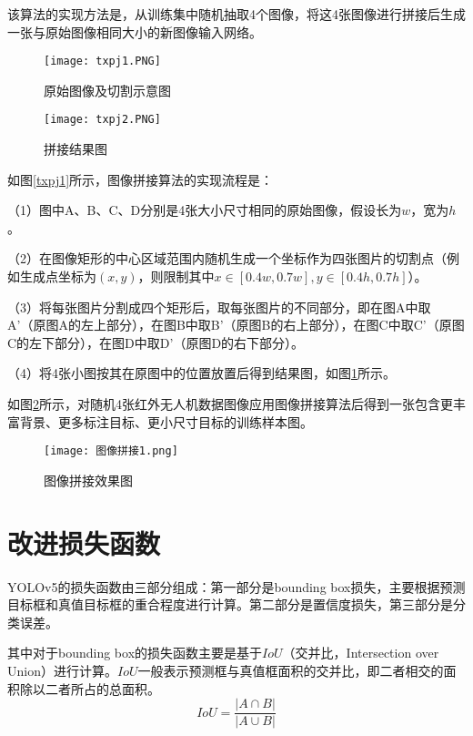 该算法的实现方法是，从训练集中随机抽取4个图像，将这4张图像进行拼接后生成一张与原始图像相同大小的新图像输入网络。

\begin{figure}[htbp]
	\centering
	\begin{minipage}{0.49\linewidth}
		\centering
		\texttt{[image: txpj1.PNG]}
		\caption{原始图像及切割示意图}
		\label{txpj1}%
	\end{minipage}
	\begin{minipage}{0.49\linewidth}
		\centering
		\texttt{[image: txpj2.PNG]}
		\caption{拼接结果图}
		\label{txpj2}%
	\end{minipage}
\end{figure}

如图\ref{txpj1}所示，图像拼接算法的实现流程是：

（1）图中A、B、C、D分别是4张大小尺寸相同的原始图像，假设长为$w$，宽为$h$。

（2）在图像矩形的中心区域范围内随机生成一个坐标作为四张图片的切割点（例如生成点坐标为$(x,y)$，则限制其中$x\in[0.4w,0.7w],y\in[0.4h,0.7h]$）。

（3）将每张图片分割成四个矩形后，取每张图片的不同部分，即在图A中取A'（原图A的左上部分），在图B中取B'（原图B的右上部分），在图C中取C'（原图C的左下部分），在图D中取D'（原图D的右下部分）。

（4）将4张小图按其在原图中的位置放置后得到结果图，如图\ref{txpj2}所示。

如图\ref{txpj}所示，对随机4张红外无人机数据图像应用图像拼接算法后得到一张包含更丰富背景、更多标注目标、更小尺寸目标的训练样本图。

\begin{figure}[htpb]
  \centering
  \texttt{[image: 图像拼接1.png]}
  \caption{图像拼接效果图}
  \label{txpj}
\end{figure}

\section{改进损失函数}
YOLOv5的损失函数由三部分组成：第一部分是bounding box损失，主要根据预测目标框和真值目标框的重合程度进行计算。第二部分是置信度损失，第三部分是分类误差。

其中对于bounding box的损失函数主要是基于$IoU$（交并比，Intersection over Union）进行计算。$IoU$一般表示预测框与真值框面积的交并比，即二者相交的面积除以二者所占的总面积。
\begin{equation}
  I o U=\frac{|A \cap B|}{|A \cup B|}
\end{equation}

